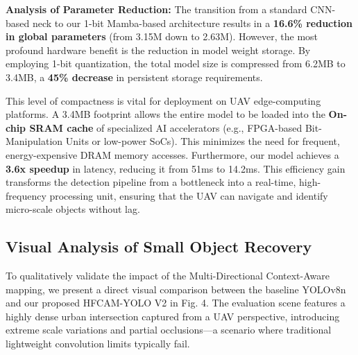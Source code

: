 \documentclass[journal]{IEEEtran}
\begin{document}
\begin{table}[!ht]
\centering
\caption{Quantitative Performance and Hardware Resource Comparison}
\label{tab_results}
\end{table}

\textbf{Analysis of Parameter Reduction:} 
The transition from a standard CNN-based neck to our 1-bit Mamba-based architecture results in a \textbf{16.6\% reduction in global parameters} (from 3.15M down to 2.63M). However, the most profound hardware benefit is the reduction in model weight storage. By employing 1-bit quantization, the total model size is compressed from 6.2MB to 3.4MB, a \textbf{45\% decrease} in persistent storage requirements.

This level of compactness is vital for deployment on UAV edge-computing platforms. A 3.4MB footprint allows the entire model to be loaded into the \textbf{On-chip SRAM cache} of specialized AI accelerators (e.g., FPGA-based Bit-Manipulation Units or low-power SoCs). This minimizes the need for frequent, energy-expensive DRAM memory accesses. Furthermore, our model achieves a \textbf{3.6x speedup} in latency, reducing it from 51ms to 14.2ms. This efficiency gain transforms the detection pipeline from a bottleneck into a real-time, high-frequency processing unit, ensuring that the UAV can navigate and identify micro-scale objects without lag.


\subsection{Visual Analysis of Small Object Recovery}
To qualitatively validate the impact of the Multi-Directional Context-Aware mapping, we present a direct visual comparison between the baseline YOLOv8n and our proposed HFCAM-YOLO V2 in Fig. 4. The evaluation scene features a highly dense urban intersection captured from a UAV perspective, introducing extreme scale variations and partial occlusions—a scenario where traditional lightweight convolution limits typically fail. 
\end{document}
